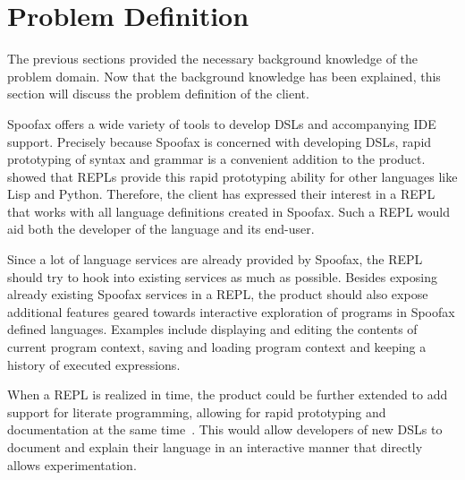 \section{Problem Definition}
\label{sec:a-problem-definition}

The previous sections provided the necessary background knowledge of
the problem domain. Now that the background knowledge has been
explained, this section will discuss the problem definition of the
client.

Spoofax offers a wide variety of tools to develop DSLs and
accompanying IDE support. Precisely because Spoofax is concerned with
developing DSLs, rapid prototyping of syntax and grammar is a
convenient addition to the product.  showed that REPLs
provide this rapid prototyping ability for other languages like Lisp
and Python. Therefore, the client has expressed their interest in
a REPL that works with all language definitions created in
Spoofax. Such a REPL would aid both the developer of the language and
its end-user.

Since a lot of language services are already provided by Spoofax, the
REPL should try to hook into existing services as much as possible.
Besides exposing already existing Spoofax services in a REPL,
the product should also expose additional features geared
towards interactive exploration of programs in Spoofax defined
languages.  Examples include displaying and editing the contents of
current program context, saving and loading program context and
keeping a history of executed expressions.

When a REPL is realized in time, the product could be further extended to add
support for literate programming, allowing for rapid prototyping and
documentation at the same time~\cite{schulte2012}. This would allow
developers of new DSLs to document and explain their language in an
interactive manner that directly allows experimentation.

